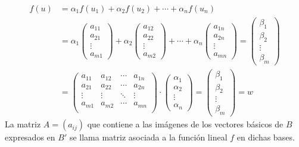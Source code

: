 \begin{align*}
  f(u) &= \alpha_1 f(u_1) + \alpha_2 f(u_2) + \cdots + \alpha_n f(u_n) \\
  &= \alpha_1 \begin{pmatrix}
    a_{11} \\ a_{21} \\ \vdots \\ a_{m1}
  \end{pmatrix} + \alpha_2 \begin{pmatrix}
    a_{12} \\ a_{22} \\ \vdots \\ a_{m2}
  \end{pmatrix} + \cdots + \alpha_n \begin{pmatrix}
    a_{1n} \\ a_{2n} \\ \vdots \\ a_{mn}
  \end{pmatrix} = \begin{pmatrix}
    \beta_1 \\ \beta_2 \\ \vdots \\ \beta_m
  \end{pmatrix} \\[4pt]
  &= \begin{pmatrix}
    a_{11} & a_{12} & \cdots & a_{1n}\\
    a_{21} & a_{22} & \cdots & a_{2n}\\
    \vdots & \vdots & \ddots & \vdots \\
    a_{m1} & a_{m2} & \cdots & a_{mn}\\
  \end{pmatrix} \cdot \begin{pmatrix}
    \alpha_1 \\ \alpha_2 \\ \vdots \\ \alpha_n
  \end{pmatrix} = \begin{pmatrix}
    \beta_1 \\ \beta_2 \\ \vdots \\ \beta_m
  \end{pmatrix} = w
\end{align*}
La matriz \(A = (a_{ij})\) que contiene a las imágenes de los vectores básicos de \(B\) expresados en \(B'\) se llama matriz asociada a la función lineal \(f\) en dichas bases.

